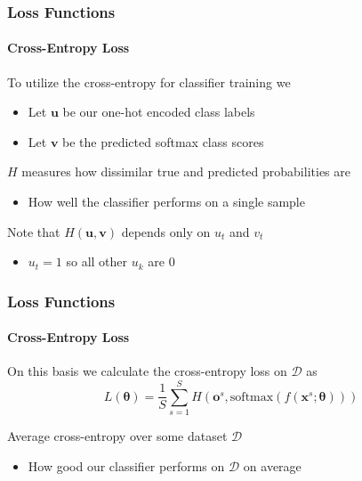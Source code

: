 \documentclass[xetex,professionalfont]{beamer}
\renewcommand\emph[1]{\textcolor{tuwcvl_cvl_blue}{#1}}
\renewcommand{\vec}[1]{\ensuremath{\mathbf{#1}}}
\newcommand{\vu}{\vec{u}}
\newcommand{\vv}{\vec{v}}
\newcommand{\vx}{\vec{x}}
\newcommand{\vo}{\vec{o}}
\newcommand{\bth}{\boldsymbol{\theta}}
\newcommand{\cD}{\mathcal{D}}
\begin{document}
\begin{frame}
  \frametitle{Loss Functions}
  \framesubtitle{Cross-Entropy Loss}

To utilize the cross-entropy for classifier training we
\begin{itemize}
    \item Let $\vu$ be our one-hot encoded class labels
    \item Let $\vv$ be the predicted softmax class scores
\end{itemize}

\bigskip

$H$ measures how dissimilar true and predicted probabilities are
\begin{itemize}
    \item How well the classifier performs on a single sample
\end{itemize}

\bigskip

Note that $H(\vu,\vv)$ depends only on $u_t$ and $v_t$
\begin{itemize}
    \item $u_t=1$ so all other $u_k$ are $0$
\end{itemize}

\end{frame}


\begin{frame}
  \frametitle{Loss Functions}
  \framesubtitle{Cross-Entropy Loss}

On this basis we calculate the \emph{cross-entropy loss} on $\cD$ as
\[
    L(\bth)=\frac{1}{S} \sum_{s=1}^S H(\vo^s,\text{softmax}(f(\vx^s;\bth)))
\]

\bigskip

Average cross-entropy over some dataset $\cD$
\begin{itemize}
    \item How good our classifier performs on $\cD$ on average
\end{itemize}

\end{frame}
\end{document}
